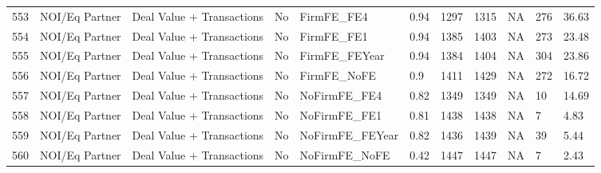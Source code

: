 \documentclass{article}
\begin{document}
\begin{table}[H]
\begin{tabular}{rllllllllll}
  553 & NOI/Eq Partner & Deal Value + Transactions & No & FirmFE\_FE4 & 0.94 & 1297 & 1315 & NA & 276 & 36.63 \\ 
  554 & NOI/Eq Partner & Deal Value + Transactions & No & FirmFE\_FE1 & 0.94 & 1385 & 1403 & NA & 273 & 23.48 \\ 
  555 & NOI/Eq Partner & Deal Value + Transactions & No & FirmFE\_FEYear & 0.94 & 1384 & 1404 & NA & 304 & 23.86 \\ 
  556 & NOI/Eq Partner & Deal Value + Transactions & No & FirmFE\_NoFE & 0.9 & 1411 & 1429 & NA & 272 & 16.72 \\ 
  557 & NOI/Eq Partner & Deal Value + Transactions & No & NoFirmFE\_FE4 & 0.82 & 1349 & 1349 & NA & 10 & 14.69 \\ 
  558 & NOI/Eq Partner & Deal Value + Transactions & No & NoFirmFE\_FE1 & 0.81 & 1438 & 1438 & NA & 7 & 4.83 \\ 
  559 & NOI/Eq Partner & Deal Value + Transactions & No & NoFirmFE\_FEYear & 0.82 & 1436 & 1439 & NA & 39 & 5.44 \\ 
  560 & NOI/Eq Partner & Deal Value + Transactions & No & NoFirmFE\_NoFE & 0.42 & 1447 & 1447 & NA & 7 & 2.43 \\ 
   \hline
\end{tabular}
\end{table}
\end{document}
